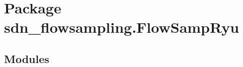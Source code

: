 %
%
%


\section{Package sdn\_flowsampling.FlowSampRyu}

    \label{sdn_flowsampling:FlowSampRyu}


\subsection{Modules}

